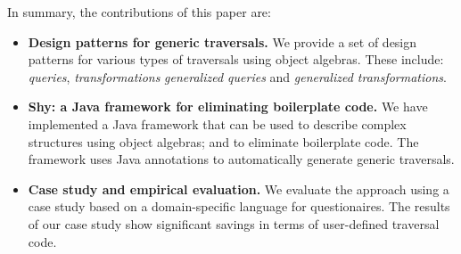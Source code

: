 \begin{comment}

Static types are useful to distinguish between different kinds
of nodes in a structure and to prevent misuses. The
distinction between different types of nodes also means that code for
dealing with each type of node is needed. However, in large structures, 
such as the Abstract Syntax Tree (AST) of a programming language, 
the amount of required code can be a problem. For some operations, 
which traverse large structures, most of the code amounts to recursively 
delegating the traversal to the child nodes. Only for some nodes 
of the structure the code needs to do something different. Still 
the programmer needs to diligently and tediously write the error-prone 
traversal code for all nodes.

In this paper we present a framework 

This approach works well for many operations,
which need different (and non-trivial) code for each different type 
of node 




The problem is particularly prominent 
in statically typed languages, where the typing discipline 
enforces strict distinctions between different cases 

Operations that traverse complex structures often require large and 
tedious amounts of boilerplate code. In those operations there are 
typically a few 

A pervasive problem in programming occurs when large tree tr

\end{comment}

In summary, the contributions of this paper are:

\begin{itemize}

\item {\bf Design patterns for generic traversals.} We provide a set of design 
patterns for various types of traversals using object algebras. These include: 
\emph{queries}, \emph{transformations}
\emph{generalized queries} and \emph{generalized transformations}.

\item {\bf Shy: a Java framework for eliminating boilerplate code.} We have implemented 
a Java framework that can be used to describe complex structures using 
object algebras; and to eliminate boilerplate code. The framework uses Java 
annotations to automatically generate generic traversals.

\item {\bf Case study and empirical evaluation.} We evaluate the approach using 
a case study based on a domain-specific language for questionaires. The results 
of our case study show significant savings in terms of user-defined traversal code.

\end{itemize}
